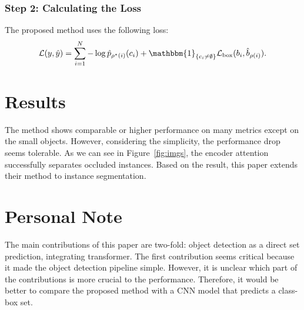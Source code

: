 \documentclass[10pt,twocolumn,letterpaper]{article}
\newcommand{\indic}[1]{\mathbbm{1}_{\{#1\}}}
\newcommand{\bloss}[1]{{\cal L}_{\rm box}(#1)}
\begin{document}
\subsubsection{Step 2: Calculating the Loss}
The proposed method uses the following loss:
\begin{align*}
	\mathcal{L}(y, \hat{y}) = \sum_{i=1}^{N} -\log\hat{p}_{\rho^{\star}(i)}(c_i) + \indic{c_i\neq\emptyset} \bloss{b_{i}, \hat{b}_{\rho(i)}}.
\end{align*}

\section{Results}
The method shows comparable or higher performance on many metrics except on the small objects. However, considering the simplicity, the performance drop seems tolerable. As we can see in Figure~\ref{fig:imgs}, the encoder attention successfully separates occluded instances. Based on the result, this paper extends their method to instance segmentation.

\section{Personal Note}
The main contributions of this paper are two-fold: object detection as a direct set prediction, integrating transformer. The first contribution seems critical because it made the object detection pipeline simple.
However, it is unclear which part of the contributions is more crucial to the performance. Therefore, it would be better to compare the proposed method with a CNN model that predicts a class-box set. 

{\small


}
\end{document}
